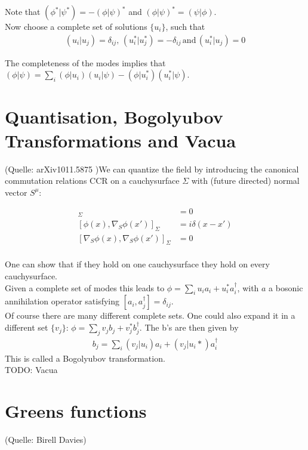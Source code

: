 Note that \((\phi^*|\psi^*) = -(\phi|\psi)^*\) and \((\phi|\psi)^* = (\psi|\phi)\).\\

Now choose a complete set of solutions $\{u_i\}$, such that
\begin{align}
(u_i| u_j) = \delta_{ij},\,(u_i^*| u_j^*) = -\delta_{ij}\,\text{and}\,(u_i^*| u_j) = 0
\end{align}

The completeness of the modes implies that \((\phi|\psi) = \sum_i (\phi|u_i)(u_i|\psi) - (\phi|u_i^*)(u_i^*|\psi)\).



\section{Quantisation, Bogolyubov Transformations and Vacua}

(Quelle: arXiv1011.5875 )We can quantize the field by introducing the canonical commutation relations CCR on a cauchysurface \(\Sigma\) with (future directed) normal vector $S^\mu$:

\begin{align}
[\phi(x),\phi(x')]_\Sigma &= 0\\
[\phi(x),\nabla_S \phi(x')]_\Sigma &= i\delta(x-x')\\
[\nabla_S \phi(x),\nabla_S \phi(x')]_\Sigma &= 0\\
\end{align}

One can show that if they hold on one cauchysurface they hold on every cauchysurface.\\
Given a complete set of modes this leads to \(\phi = \sum_i u_i a_i + u_i^* a_i^\dagger\), with \(a\) a bosonic annihilation operator satisfying \([a_i,a_j^\dagger] = \delta_{ij}\).\\

Of course there are many different complete sets. One could also expand it in a different set \(\{v_j\}\): \(\phi = \sum_j v_j b_j + v_j^* b_j^\dagger\). The b's are then given by 
\begin{align}
b_j = \sum_i (v_j|u_i) a_i + (v_j|u_i*) a_i^\dagger
\label{equ:qft_bogolyubov}
\end{align}
This is called a Bogolyubov transformation.\\

\missingfigure{}
TODO: Vacua

\section{Greens functions}
(Quelle: Birell Davies)
